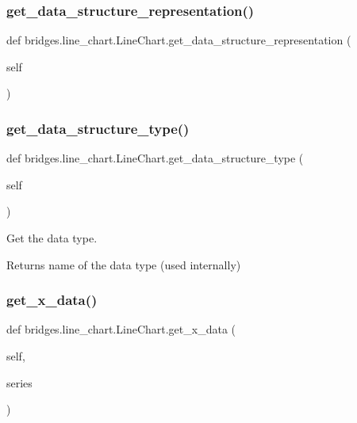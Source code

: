 \subsubsection{\texorpdfstring{get\+\_\+data\+\_\+structure\+\_\+representation()}{get\_data\_structure\_representation()}}
{\footnotesize\ttfamily def bridges.\+line\+\_\+chart.\+Line\+Chart.\+get\+\_\+data\+\_\+structure\+\_\+representation (\begin{DoxyParamCaption}\item[{}]{self }\end{DoxyParamCaption})}

\mbox{\label{classbridges_1_1line__chart_1_1_line_chart_a8124cb8693d6564a64264747d6ca5021}} 
\subsubsection{\texorpdfstring{get\+\_\+data\+\_\+structure\+\_\+type()}{get\_data\_structure\_type()}}
{\footnotesize\ttfamily def bridges.\+line\+\_\+chart.\+Line\+Chart.\+get\+\_\+data\+\_\+structure\+\_\+type (\begin{DoxyParamCaption}\item[{}]{self }\end{DoxyParamCaption})}



Get the data type. 

\begin{DoxyReturn}{Returns}
name of the data type (used internally) 
\end{DoxyReturn}
\mbox{\label{classbridges_1_1line__chart_1_1_line_chart_af1f00a86504734b3f1a8209c66052422}} 
\subsubsection{\texorpdfstring{get\+\_\+x\+\_\+data()}{get\_x\_data()}}
{\footnotesize\ttfamily def bridges.\+line\+\_\+chart.\+Line\+Chart.\+get\+\_\+x\+\_\+data (\begin{DoxyParamCaption}\item[{}]{self,  }\item[{}]{series }\end{DoxyParamCaption})}



